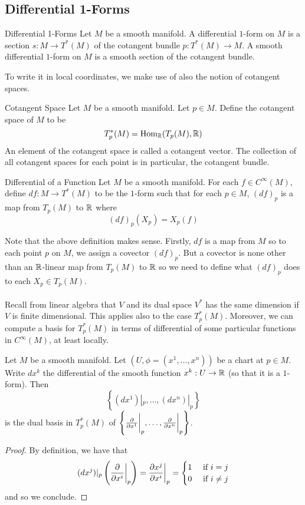 \documentclass[a4paper]{article}
\begin{document}
\subsection{Differential 1-Forms}
\begin{defn}{Differential 1-Forms}{} Let $M$ be a smooth manifold. A differential $1$-form on $M$ is a section $s:M\to T^\ast(M)$ of the cotangent bundle $p:T^\ast(M)\to M$. A smooth differential $1$-form on $M$ is a smooth section of the cotangent bundle. 
\end{defn}

To write it in local coordinates, we make use of also the notion of cotangent spaces. 

\begin{defn}{Cotangent Space}{} Let $M$ be a smooth manifold. Let $p\in M$. Define the cotangent space of $M$ to be $$T_p^\ast(M)=\operatorname{Hom}_{\mathbb{R}}(T_p(M),\mathbb{R})$$ An element of the cotangent space is called a cotangent vector. The collection of all cotangent spaces for each point is in particular, the cotangent bundle. 
\end{defn}

\begin{defn}{Differential of a Function}{} Let $M$ be a smooth manifold. For each $f\in C^\infty(M)$, define $df:M\to T^\ast(M)$ to be the $1$-form such that for each $p\in M$, $(df)_p$ is a map from $T_p(M)$ to $\mathbb{R}$ where $$(df)_p(X_p)=X_p(f)$$
\end{defn}

Note that the above definition makes sense. Firstly, $df$ is a map from $M$ so to each point $p$ on $M$, we assign a covector $(df)_p$. But a covector is none other than an $\mathbb{R}$-linear map from $T_p(M)$ to $\mathbb{R}$ so we need to define what $(df)_p$ does to each $X_p\in T_p(M)$. \\~\\

Recall from linear algebra that $V$ and its dual space $V^\ast$ has the same dimension if $V$ is finite dimensional. This applies also to the case $T_p^\ast(M)$. Moreover, we can compute a basis for $T_p^\ast(M)$ in terms of differential of some particular functions in $C^\infty(M)$, at least locally. 

\begin{prp}{}{} Let $M$ be a smooth manifold. Let $(U,\phi=(x^1,\dots,x^n))$ be a chart at $p\in M$. Write $dx^k$ the differential of the smooth function $x^k:U\to\mathbb{R}$ (so that it is a $1$-form). Then $$\left\{(dx^1)|_p,\dots,(dx^n)|_p\right\}$$ is the dual basis in $T_p^\ast(M)$ of $\left\{\frac{\partial}{\partial x^1}\bigg\vert_p,\dots,\frac{\partial}{\partial x^n}\bigg{|}_p\right\}$. \tcbline
\begin{proof}
By definition, we have that $$(dx^j)|_p\left(\frac{\partial}{\partial x^i}\bigg{|}_p\right)=\frac{\partial x^j}{\partial x^i}\bigg{|}_p=\begin{cases}
1 & \text{ if } i=j\\
0 & \text{ if } i\neq j
\end{cases}$$
and so we conclude. 
\end{proof}
\end{prp}
\end{document}

